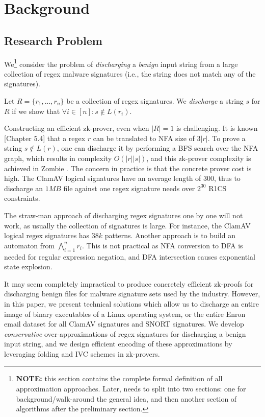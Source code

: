 \section{Background}
\subsection{Research Problem}
We\footnote{
{\bf NOTE:} this section contains the complete formal definition of
all approximation approaches. Later, needs to split into two sections:
one for background/walk-around the general idea, and then another section
of algorithms after the preliminary section.}
consider the problem of {\em discharging} a {\em benign} input
string from a large collection of regex malware signatures (i.e.,
the string does not match any of the signatures).

\begin{definition} Let $R = \{r_1, ..., r_n\}$ be a collection
of regex signatures. 
We {\em discharge} a string $s$ for $R$ if 
we show that $\forall i\in [n]: s \not\in L(r_i)$.
\end{definition}

Constructing an efficient zk-prover, even when $|R|=1$ is 
challenging. It is known \cite{AlgBook}[Chapter 5.4] that
a regex $r$ can be translated to NFA size of $3|r|$.
To prove a string $s \not\in L(r)$, one can discharge it
by performing a BFS search over the NFA graph, which results
in complexity $O(|r| |s|)$, and this zk-prover complexity is achieved 
in Zombie \cite{Zombie23}. The concern in practice is that
the concrete prover cost is high. 
The ClamAV logical signatures have an average length of $300$,
thus to discharge an $1MB$ file against one regex signature needs
over $2^{30}$ R1CS constraints. 

The straw-man approach of discharging regex signatures one by one
will not work, as usually the collection of signatures is large.
For instance, the ClamAV logical regex signatures has
$38k$ patterns. Another approach is to build an automaton
from $\bigwedge_{i=1}^n \bar{r_i}$. This is not practical as
NFA conversion to DFA is needed for regular expression
negation, and DFA intersection causes exponential state explosion.

It may seem completely impractical to produce concretely
efficient zk-proofs for discharging benign files for
malware signature sets used by the industry. 
However, in this paper, we present technical solutions
which allow us to discharge an entire image of binary executables
of a Linux operating system, or the entire Enron email dataset
for all ClamAV signatures and SNORT signatures.
We develop {\em conservative} over-approximations of
regex signatures for discharging a benign input string,
and we design efficient encoding of these approximations
by leveraging folding and IVC schemes in zk-provers.

